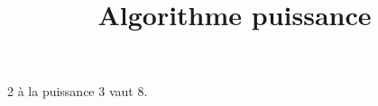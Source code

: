 \documentclass{article}
\title{Algorithme puissance}
\author{}
\date{}
\begin{document}
  \maketitle
  

  2 \`a la puissance 3 vaut 8.
\end{document}
